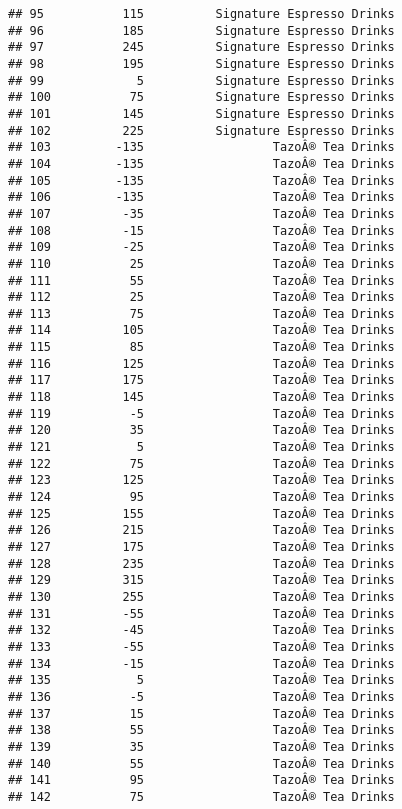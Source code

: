 \documentclass[
]{article}
\begin{document}
\begin{verbatim}
## 95           115          Signature Espresso Drinks
## 96           185          Signature Espresso Drinks
## 97           245          Signature Espresso Drinks
## 98           195          Signature Espresso Drinks
## 99             5          Signature Espresso Drinks
## 100           75          Signature Espresso Drinks
## 101          145          Signature Espresso Drinks
## 102          225          Signature Espresso Drinks
## 103         -135                  TazoÂ® Tea Drinks
## 104         -135                  TazoÂ® Tea Drinks
## 105         -135                  TazoÂ® Tea Drinks
## 106         -135                  TazoÂ® Tea Drinks
## 107          -35                  TazoÂ® Tea Drinks
## 108          -15                  TazoÂ® Tea Drinks
## 109          -25                  TazoÂ® Tea Drinks
## 110           25                  TazoÂ® Tea Drinks
## 111           55                  TazoÂ® Tea Drinks
## 112           25                  TazoÂ® Tea Drinks
## 113           75                  TazoÂ® Tea Drinks
## 114          105                  TazoÂ® Tea Drinks
## 115           85                  TazoÂ® Tea Drinks
## 116          125                  TazoÂ® Tea Drinks
## 117          175                  TazoÂ® Tea Drinks
## 118          145                  TazoÂ® Tea Drinks
## 119           -5                  TazoÂ® Tea Drinks
## 120           35                  TazoÂ® Tea Drinks
## 121            5                  TazoÂ® Tea Drinks
## 122           75                  TazoÂ® Tea Drinks
## 123          125                  TazoÂ® Tea Drinks
## 124           95                  TazoÂ® Tea Drinks
## 125          155                  TazoÂ® Tea Drinks
## 126          215                  TazoÂ® Tea Drinks
## 127          175                  TazoÂ® Tea Drinks
## 128          235                  TazoÂ® Tea Drinks
## 129          315                  TazoÂ® Tea Drinks
## 130          255                  TazoÂ® Tea Drinks
## 131          -55                  TazoÂ® Tea Drinks
## 132          -45                  TazoÂ® Tea Drinks
## 133          -55                  TazoÂ® Tea Drinks
## 134          -15                  TazoÂ® Tea Drinks
## 135            5                  TazoÂ® Tea Drinks
## 136           -5                  TazoÂ® Tea Drinks
## 137           15                  TazoÂ® Tea Drinks
## 138           55                  TazoÂ® Tea Drinks
## 139           35                  TazoÂ® Tea Drinks
## 140           55                  TazoÂ® Tea Drinks
## 141           95                  TazoÂ® Tea Drinks
## 142           75                  TazoÂ® Tea Drinks

\end{verbatim}
\end{document}
